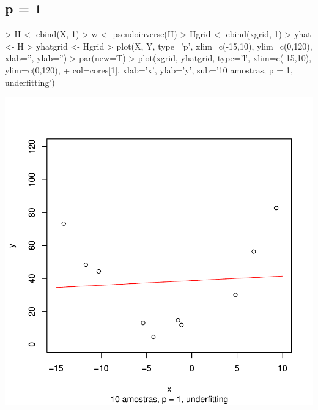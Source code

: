 \documentclass{article}
\begin{document}
\subsection{p = 1}
\begin{Schunk}
\begin{Sinput}
> H <- cbind(X, 1)
> w <- pseudoinverse(H) %
> Hgrid <- cbind(xgrid, 1)
> yhat <- H %
> yhatgrid <- Hgrid %
> plot(X, Y, type='p', xlim=c(-15,10), ylim=c(0,120), xlab='', ylab='')
> par(new=T)
> plot(xgrid, yhatgrid, type='l', xlim=c(-15,10), ylim=c(0,120), 
+      col=cores[1], xlab='x', ylab='y', sub='10 amostras, p = 1, underfitting')
\end{Sinput}
\end{Schunk}
\includegraphics{aprox-002}
\end{document}
